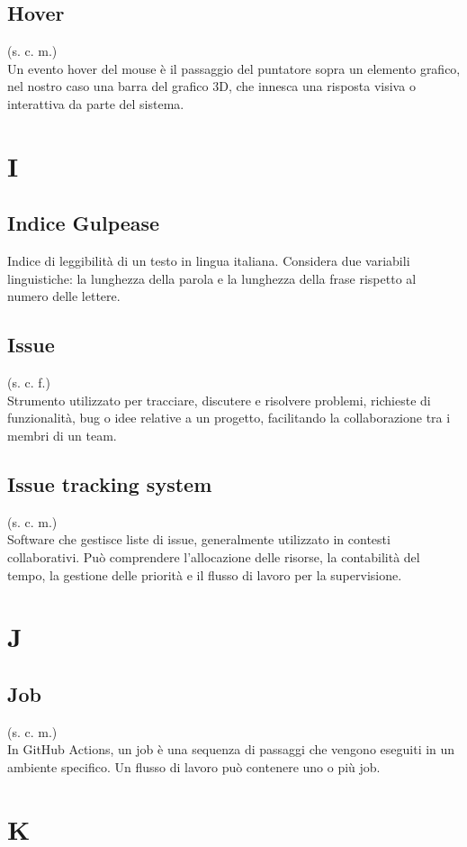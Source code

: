     \subsection{Hover}
    (s. c. m.)\\
    Un evento hover del mouse è il passaggio del puntatore sopra un elemento grafico, nel nostro caso una barra del grafico 3D, che innesca una risposta visiva o interattiva da parte del sistema.
\pagebreak
\section{I}
    \subsection{Indice Gulpease}
    Indice di leggibilità di un testo in lingua italiana. Considera due variabili 
    linguistiche: la lunghezza della parola e la lunghezza della frase rispetto 
    al numero delle lettere.
    \subsection{Issue}
    \label{Issue}
    (s. c. f.)\\
    Strumento utilizzato per tracciare, discutere e risolvere problemi, richieste di funzionalità, 
    bug o idee relative a un progetto, facilitando la collaborazione tra i membri di un team.
    \subsection{Issue tracking system}
    (s. c. m.)\\
    Software che gestisce liste di issue, generalmente utilizzato in contesti collaborativi.
    Può comprendere l'allocazione delle risorse, la contabilità del tempo, la gestione delle 
    priorità e il flusso di lavoro per la supervisione.
\pagebreak
\section{J}
    \subsection{Job}
    (s. c. m.)\\
    In GitHub Actions, un job è una sequenza di passaggi che vengono eseguiti
    in un ambiente specifico. Un flusso di lavoro può contenere uno o più job.
\pagebreak
\section{K}
\pagebreak
